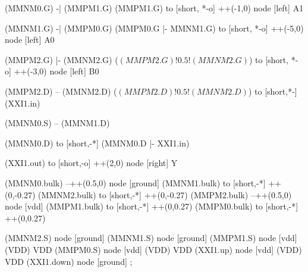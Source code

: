 \begin{circuitikz}[american]
	(MMNM0.G) -| (MMPM1.G)
	(MMPM1.G) to [short, *-o] ++(-1,0) node [left] {A1}
	
	(MMNM1.G) -| (MMPM0.G)
	(MMPM0.G |- MMNM1.G) to [short, *-o] ++(-5,0) node [left] {A0}
	
	(MMPM2.G) |- (MMNM2.G) 
	($(MMPM2.G)!0.5!(MMNM2.G)$) to [short, *-o] ++(-3,0) node [left] {B0}
	
	(MMPM2.D) -- (MMNM2.D)
	($(MMPM2.D)!0.5!(MMNM2.D)$) to [short,*-]  (XXI1.in)
	
	(MMNM0.S) -- (MMNM1.D)
	
	(MMNM0.D) to [short,-*] (MMNM0.D |- XXI1.in)
	

	(XXI1.out) to [short,-o] ++(2,0) node [right] {Y}
	
	(MMNM0.bulk) --++(0.5,0) node [ground]{}
	(MMNM1.bulk) to [short,-*] ++(0,-0.27)
	(MMNM2.bulk) to [short,-*] ++(0,-0.27)
	(MMPM2.bulk) --++(0.5,0) node [vdd]{}
	(MMPM1.bulk) to [short,-*] ++(0,0.27)
	(MMPM0.bulk) to [short,-*] ++(0,0.27)	


	(MMNM2.S) node [ground] {}
	(MMNM1.S) node [ground] {}
	(MMPM1.S) node [vdd] (VDD) {VDD}
	(MMPM0.S) node [vdd] (VDD) {VDD}
	(XXI1.up) node [vdd] (VDD) {VDD}
	(XXI1.down) node [ground] {}
;

\end{circuitikz}
